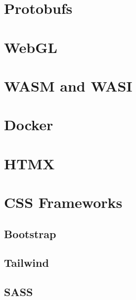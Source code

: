 \documentclass{article}
\begin{document}
\section{Protobufs}

\section{WebGL}

\section{WASM and WASI}

\section{Docker}

\section{HTMX}

\section{CSS Frameworks}

\subsection{Bootstrap}

\subsection{Tailwind}

\subsection{SASS}
\end{document}

